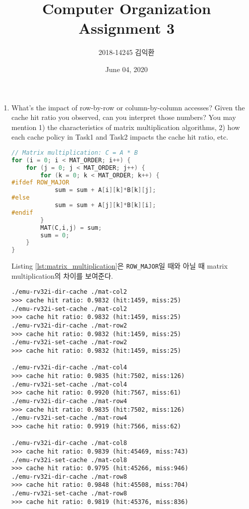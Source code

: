 \documentclass[
    a4paper,
    oneside,
    adjustmath,
    finemath,
    itemph,
    nonfrench,
    11pt
]{oblivoir}
\title{Computer Organization\\Assignment 3}
\author{2018-14245 김익환}
\date{June 04, 2020}
\begin{document}
    \maketitle
    \begin{enumerate}
        \item \label{enum:q1} What's the impact of row-by-row or column-by-column accesses?
        Given the cache hit ratio you observed, can you interpret those numbers?
        You may mention 1) the characteristics of matrix multiplication algorithms, 2) how each cache policy in Task1 and Task2 impacts the cache hit ratio, etc.

        \begin{lstlisting}[language=C, caption=Matrix multiplication, label=lst:matrix_multiplication]
// Matrix multiplication: C = A * B
for (i = 0; i < MAT_ORDER; i++) {
    for (j = 0; j < MAT_ORDER; j++) {
        for (k = 0; k < MAT_ORDER; k++) {
#ifdef ROW_MAJOR
            sum = sum + A[i][k]*B[k][j];
#else
            sum = sum + A[j][k]*B[k][i];
#endif
        }
        MAT(C,i,j) = sum;
        sum = 0;
    }
}
        \end{lstlisting}

        Listing \ref{lst:matrix_multiplication}은 \verb|ROW_MAJOR|일 때와 아닐 때 matrix multiplication의 차이를 보여준다.
        
        \begin{lstlisting}[caption=Difference by row and column, label=lst:diff_row_col]
./emu-rv32i-dir-cache ./mat-col2
>>> cache hit ratio: 0.9832 (hit:1459, miss:25)
./emu-rv32i-set-cache ./mat-col2
>>> cache hit ratio: 0.9832 (hit:1459, miss:25)
./emu-rv32i-dir-cache ./mat-row2
>>> cache hit ratio: 0.9832 (hit:1459, miss:25)
./emu-rv32i-set-cache ./mat-row2
>>> cache hit ratio: 0.9832 (hit:1459, miss:25)

./emu-rv32i-dir-cache ./mat-col4
>>> cache hit ratio: 0.9835 (hit:7502, miss:126)
./emu-rv32i-set-cache ./mat-col4
>>> cache hit ratio: 0.9920 (hit:7567, miss:61)
./emu-rv32i-dir-cache ./mat-row4
>>> cache hit ratio: 0.9835 (hit:7502, miss:126)
./emu-rv32i-set-cache ./mat-row4
>>> cache hit ratio: 0.9919 (hit:7566, miss:62)

./emu-rv32i-dir-cache ./mat-col8
>>> cache hit ratio: 0.9839 (hit:45469, miss:743)
./emu-rv32i-set-cache ./mat-col8
>>> cache hit ratio: 0.9795 (hit:45266, miss:946)
./emu-rv32i-dir-cache ./mat-row8
>>> cache hit ratio: 0.9848 (hit:45508, miss:704)
./emu-rv32i-set-cache ./mat-row8
>>> cache hit ratio: 0.9819 (hit:45376, miss:836)


\end{lstlisting}
\end{enumerate}
\end{document}

